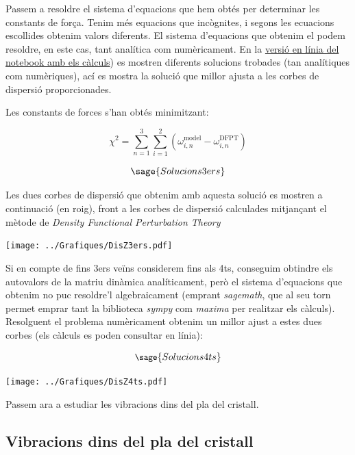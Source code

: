 \documentclass[12pt]{article} %
\begin{document}
{Passem a resoldre el sistema d'equacions que hem obtés per determinar les constants de força.
Tenim més equacions que incògnites, i segons les ecuacions escollides obtenim valors diferents. El sistema d'equacions que obtenim el podem resoldre, en este cas, tant analítica com numèricament.
En la \href{https://casimirvictoria.github.io/TFG-Semiconductores_2D/index.html}{versió en línia del notebook amb els càlculs}) es mostren diferents solucions trobades (tan analítiques com numèriques), ací es mostra la solució que millor ajusta a les corbes de dispersió proporcionades.

Les constants de forces s'han obtés minimitzant:

\begin{equation}
\chi^2=\sum_{n=1}^3\sum_{i=1}^2\left(\omega_{i,n}^\text{model}-\omega_{i, n}^\text{DFPT}\right)
\end{equation}


\begin{equation}
 \sage{Solucions3ers}
\end{equation}

Les dues corbes de dispersió que obtenim amb aquesta solució es mostren a continuació (en roig), front a les corbes de dispersió calculades mitjançant el mètode de \emph{Density Functional Perturbation Theory}

\begin{center}
\texttt{[image: ../Grafiques/DisZ3ers.pdf]}
\end{center}

Si en compte de fins 3ers veïns considerem fins als 4ts, conseguim obtindre els autovalors de la matriu dinàmica analíticament, però el sistema d'equacions que obtenim no puc resoldre'l algebraicament (emprant \textit{sagemath}, que al seu torn permet emprar tant la biblioteca \textit{sympy} com \textit{maxima} per realitzar els càlculs).  Resolguent el problema numèricament obtenim un millor ajust a estes dues corbes (els càlculs es poden consultar en línia):

\begin{equation}\small{
 \sage{Solucions4ts}}
\end{equation}

\begin{center}
\texttt{[image: ../Grafiques/DisZ4ts.pdf]}
\end{center}

Passem ara a estudiar les vibracions dins del pla del cristall.

\subsection{Vibracions dins del pla del cristall}

}
\end{document}
